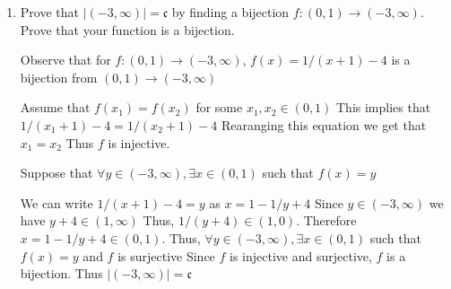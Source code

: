 \documentclass{article}
\newcommand{\bN}{\mathbb{N}}
\newcommand{\fc}{\mathfrak{c}}
\begin{document}
{\begin{enumerate}[labelindent=0pt,leftmargin=0pt]
    Therefore it must hold $a_1 = a_2$.
    Thus $f$ is injective. 

    Since $A$ is an infinte subset of $\bN$ we can list its elements in increasing order with the n-th smallest element of this list being $a_n$. 
    By definition of $f$, $f(a_n)$ us the number of elements in $A$ that are less than or equal to $a_n$. Thus $f(a_n)=n$

    Thus $\forall n \in\bN$, $\exists a \in A$ such that $f(a) = n$ which implies $f$ is surjective 

    Thus, since $f$ is both injective and surjective, it is bijective. 
    Thus $|A| = \aleph_0$ 
    





    \item Prove that $|(-3,\infty)|=\fc$ by finding a bijection $f:(0,1)\to(-3,\infty)$. Prove that your function is a bijection.

    Observe that for $f:(0,1)\to(-3,\infty)$, $f(x)= 1/(x+1) -4 $ is a bijection from $(0,1)\to(-3,\infty)$

    Assume that $f(x_1) = f(x_2)$ for some $x_1,x_2 \in (0,1)$
    This implies that $1/(x_1+1) -4 = 1/(x_2+1) -4$ Rearanging this equation we get that $x_1 = x_2$ 
    Thus $f$ is injective. 

    Suppose that $\forall y \in (-3,\infty), \exists x \in (0,1)$ such that $f(x) = y$

    We can write $1/(x+1) -4 = y$ as $x = 1 - 1/y+4$   
    Since $y \in (-3,\infty)$ we have $y+4 \in (1,\infty)$ 
    Thus, $1/(y+4) \in (1,0)$.
    Therefore $x = 1 - 1/y+4 \in (0,1)$. 
    Thus, $\forall y \in (-3,\infty), \exists x \in (0,1)$ such that $f(x)=y$ and $f$ is surjective 
    Since $f$ is injective and surjective, $f$ is a bijection. 
    Thus $|(-3,\infty)| = \fc$ 







    
    
    \end{enumerate}

}
\end{document}
